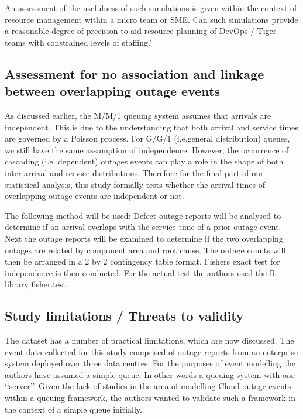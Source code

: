 \documentclass[5p]{elsarticle}
\begin{document}
An assessment of the usefulness of such simulations is given within the context of resource management within a micro team or SME. Can such simulations provide a reasonable degree of precision to aid resource planning of DevOps / Tiger teams with constrained levels of staffing?

\subsection{Assessment for no association and linkage between overlapping outage events}

As discussed earlier, the M/M/1 queuing system assumes that arrivals are independent. This is due to the understanding that both arrival and service times are governed by a Poisson process. For G/G/1 (i.e.general distribution) queues, we still have the same assumption of independence. However, the occurrence of cascading (i.e. dependent) outages events can play a role in the shape of both inter-arrival and service distributions. Therefore for the final part of our statistical analysis, this study formally tests whether the arrival times of overlapping outage events are independent or not. 

The following method will be used: Defect outage reports will be analysed to determine if an arrival overlaps with the service time of a prior outage event. Next the outage reports will be examined to determine if the two overlapping outages are related by component area and root cause. The outage counts will then be arranged in a 2 by 2 contingency table format. Fishers exact test for independence\cite{fisher1922interpretation}\cite{fisher1925statistical} is then conducted. For the actual test the authors used the R library fisher.test \cite{FisherExact}. 

\subsection{Study limitations / Threats to validity}

The dataset has a number of practical limitations, which are now discussed. The event data collected for this study comprised of outage reports from an enterprise system deployed over three data centres. For the purposes of event modelling the authors have assumed a simple queue. In other words a queuing system with one \lq\lq server\rq\rq. Given the lack of studies in the area of modelling Cloud outage events within a queuing framework, the authors wanted to validate such a framework in the context of a simple queue initially. 
\end{document}
